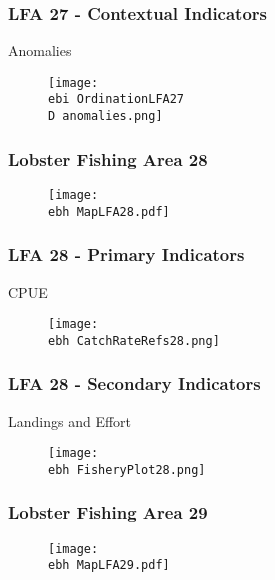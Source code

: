 \documentclass{beamer}
\newcommand{\ebh}{\string~/bio.data/bio.lobster/figures/Assessment/LFA2732/} %
\newcommand{\ebi}{\string~/bio.data/bio.lobster/figures/Assessment/Indicators/} %
\newcommand{\D}{.}
\begin{document}
\begin{frame}
\frametitle{LFA 27 - Contextual Indicators}
Anomalies
\begin{figure}
        \begin{center}
            \texttt{[image: \\ebi OrdinationLFA27\\D anomalies.png]}
        \end{center}
    \end{figure}
\end{frame}




\begin{frame}
\frametitle{Lobster Fishing Area 28}
\begin{figure}
        \begin{center}
            \texttt{[image: \\ebh MapLFA28.pdf]}
        \end{center}
    \end{figure}
\end{frame}


\begin{frame}
\frametitle{LFA 28 - Primary Indicators}
CPUE
\begin{figure}
        \begin{center}
            \texttt{[image: \\ebh CatchRateRefs28.png]}
        \end{center}
    \end{figure}
\end{frame}



\begin{frame}
\frametitle{LFA 28 - Secondary Indicators}
Landings and Effort
\begin{figure}
        \begin{center}
            \texttt{[image: \\ebh FisheryPlot28.png]}
        \end{center}
    \end{figure}
\end{frame}





\begin{frame}
\frametitle{Lobster Fishing Area 29}
\begin{figure}
        \begin{center}
            \texttt{[image: \\ebh MapLFA29.pdf]}
        \end{center}
    \end{figure}
\end{frame}
\end{document}

